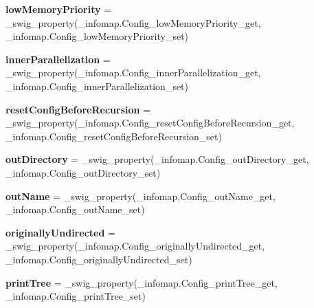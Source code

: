\begin{DoxyCompactItemize}
\item 
\mbox{\label{classinfomap_1_1Config_ac956184952e5dcac4945a184a2898a7f}} 
{\bfseries low\+Memory\+Priority} = \+\_\+swig\+\_\+property(\+\_\+infomap.\+Config\+\_\+low\+Memory\+Priority\+\_\+get, \+\_\+infomap.\+Config\+\_\+low\+Memory\+Priority\+\_\+set)
\item 
\mbox{\label{classinfomap_1_1Config_a3d0b0263e7ec7f052e2635886a021e3b}} 
{\bfseries inner\+Parallelization} = \+\_\+swig\+\_\+property(\+\_\+infomap.\+Config\+\_\+inner\+Parallelization\+\_\+get, \+\_\+infomap.\+Config\+\_\+inner\+Parallelization\+\_\+set)
\item 
\mbox{\label{classinfomap_1_1Config_acfe1031d125941d1cf36d25cc409ce22}} 
{\bfseries reset\+Config\+Before\+Recursion} = \+\_\+swig\+\_\+property(\+\_\+infomap.\+Config\+\_\+reset\+Config\+Before\+Recursion\+\_\+get, \+\_\+infomap.\+Config\+\_\+reset\+Config\+Before\+Recursion\+\_\+set)
\item 
\mbox{\label{classinfomap_1_1Config_afa43156d18b114ad27d1a7dc7dd6c4ef}} 
{\bfseries out\+Directory} = \+\_\+swig\+\_\+property(\+\_\+infomap.\+Config\+\_\+out\+Directory\+\_\+get, \+\_\+infomap.\+Config\+\_\+out\+Directory\+\_\+set)
\item 
\mbox{\label{classinfomap_1_1Config_ac3fa0bfcbefade137ea2c7eabb757ff8}} 
{\bfseries out\+Name} = \+\_\+swig\+\_\+property(\+\_\+infomap.\+Config\+\_\+out\+Name\+\_\+get, \+\_\+infomap.\+Config\+\_\+out\+Name\+\_\+set)
\item 
\mbox{\label{classinfomap_1_1Config_a80210b0756d888d32663ceed59c616cc}} 
{\bfseries originally\+Undirected} = \+\_\+swig\+\_\+property(\+\_\+infomap.\+Config\+\_\+originally\+Undirected\+\_\+get, \+\_\+infomap.\+Config\+\_\+originally\+Undirected\+\_\+set)
\item 
\mbox{\label{classinfomap_1_1Config_a39c7ad6685d9dc46db554d8aca1d8bac}} 
{\bfseries print\+Tree} = \+\_\+swig\+\_\+property(\+\_\+infomap.\+Config\+\_\+print\+Tree\+\_\+get, \+\_\+infomap.\+Config\+\_\+print\+Tree\+\_\+set)
\item 
\mbox{\label{classinfomap_1_1Config_adedc321fee3069f0ee5f651a3817fce5}} 

\end{DoxyCompactItemize}
